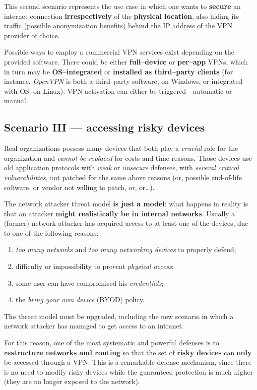 \documentclass[10pt]{extreport}
\begin{document}
This second scenario represents the use case in which one wants to
\textbf{secure} an internet connection \textbf{irrespectively} of the
\textbf{physical location}, also hiding its traffic (possible anonymization
benefits) behind the IP address of the VPN provider of choice.

Possible ways to employ a commercial VPN services exist depending on the
provided software. There could be either \textbf{full--device} or
\textbf{per--app} VPNs, which in turn may be \textbf{OS--integrated} or
\textbf{installed as third--party clients} (for instance, \emph{OpenVPN} is
both a third--party software, on Windows, or integrated with OS, on Linux). VPN
activation can either be triggered---automatic or manual.

\subsection{Scenario III --- accessing risky devices}

Real organizations possess many devices that both play a \emph{crucial} role
for the organization and \emph{cannot be replaced} for costs and time reasons.
Those devices use old application protocols with \emph{weak} or \emph{unsecure}
defenses, with \emph{several critical vulnerabilities}, not patched for the
same above reasons (or, possible end-of-life software, or vendor not willing to
patch, or, or\dots).

The network attacker threat model \textbf{is just a model}: what happens in
reality is that an attacker \textbf{might realistically be in internal
networks}. Usually a (former) network attacker has acquired access to at least
one of the devices, due to one of the following reasons:
\begin{enumerate}
    \item \emph{too many networks} and \emph{too many networking devices} to
        properly defend;
    \item difficulty or impossibility to prevent \emph{physical access};
    \item some user can have compromised his \emph{credentials};
    \item the \emph{bring your own device} (BYOD) policy.
\end{enumerate}

The threat model must be upgraded, including the new scenario in which a
network attacker has managed to get access to an intranet.

For this reason, one of the most systematic and powerful defenses is to
\textbf{restructure networks and routing} so that the set of \textbf{risky
devices} can \textbf{only} be accessed through a VPN. This is a remarkable
defense mechanism, since there is no need to modify risky devices while the
guaranteed protection is much higher (they are no longer exposed to the
network).
\end{document}
